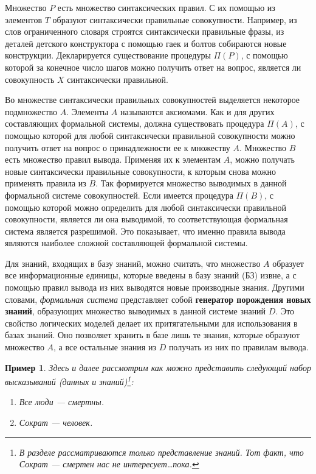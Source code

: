 \documentclass[12pt, openany, twoside]{book} %
\newtheorem{example}{Пример}[chapter]
\begin{document}
Множество $P$ есть множество синтаксических правил. С их помощью из элементов $T$ образуют синтаксически правильные совокупности. Например, из слов ограниченного словаря строятся синтаксически правильные фразы, из деталей детского конструктора с помощью гаек и болтов собираются новые конструкции. Декларируется существование процедуры $\Pi(P)$, с помощью которой за конечное число шагов можно получить ответ на вопрос, является ли совокупность $X$ синтаксически правильной.

Во множестве синтаксически правильных совокупностей выделяется некоторое подмножество $A$. Элементы $A$ называются аксиомами. Как и для других составляющих формальной системы, должна существовать процедура $\Pi(A)$, с помощью которой для любой синтаксически правильной совокупности можно получить ответ на вопрос о принадлежности ее к множеству $A$. Множество $B$ есть множество правил вывода. Применяя их к элементам $A$, можно получать новые синтаксически правильные совокупности, к которым снова можно применять правила из $B$. Так формируется множество выводимых в данной формальной системе совокупностей. Если имеется процедура $\Pi(B)$, с помощью которой можно определить для любой синтаксически правильной совокупности, является ли она выводимой, то соответствующая формальная система является разрешимой. Это показывает, что именно правила вывода являются наиболее сложной составляющей формальной системы.

Для знаний, входящих в базу знаний, можно считать, что множество $A$ образует все информационные единицы, которые введены в базу знаний (БЗ) извне, а с помощью правил вывода из них выводятся новые производные знания. Другими словами, {\em формальная система} представляет собой {\bf генератор порождения новых знаний}, образующих множество выводимых в данной системе знаний $D$. Это свойство логических моделей делает их притягательными для использования в базах знаний. Оно позволяет хранить в базе лишь те знания, которые образуют множество $A$, а все остальные знания из $D$ получать из них по правилам вывода.

\begin{example} Здесь и далее рассмотрим как можно представить следующий набор высказываний (данных и знаний)\footnote{В разделе рассматриваются только представление знаний. Тот факт, что Сократ --- смертен нас не интересует\ldots пока.}:
\label{ex:repr:main}
\begin{enumerate}
\item Все люди --- смертны.
\item Сократ --- человек.
\end{enumerate}
\end{example}
\end{document}

